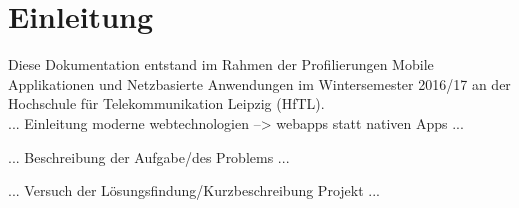 \section{Einleitung}

Diese Dokumentation entstand im Rahmen der Profilierungen  \glqq{}Mobile Applikationen\grqq{} und \glqq{}Netzbasierte Anwendungen\grqq{} im Wintersemester 2016/17 an der Hochschule für Telekommunikation Leipzig (HfTL). \\


... Einleitung moderne webtechnologien --> webapps statt nativen Apps ... 

... Beschreibung der Aufgabe/des Problems ...

... Versuch der Lösungsfindung/Kurzbeschreibung Projekt ...